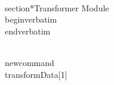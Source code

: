 \\section*{Transformer Module}
\\begin{verbatim}
% Transformer Module for TeX Data Processing
% This module transforms the validated data.
% Transformations include:
% 1. Trimming whitespace.
% 2. Normalizing numeric values to a standard range.
% 3. Aggregating data.
\\end{verbatim}

\\newcommand{\\transformData}[1]{
}
